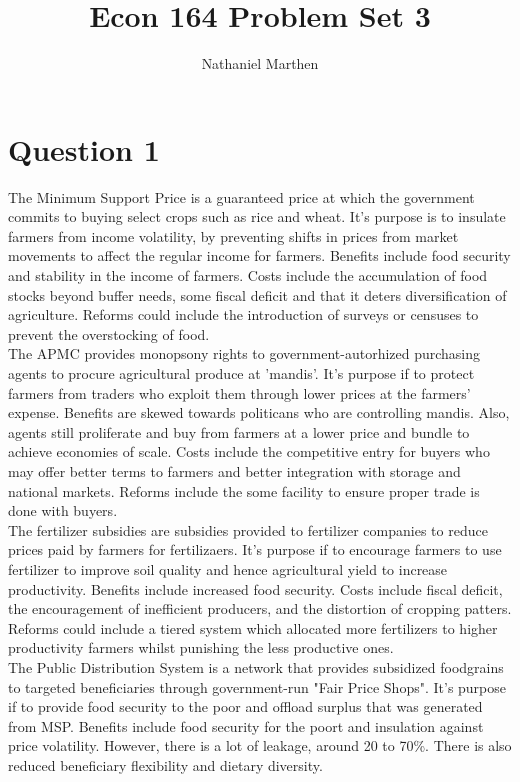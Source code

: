 \documentclass{article}
\title{Econ 164 Problem Set 3}
\author{Nathaniel Marthen}
\theoremstyle{mytheoremstyle}
\theoremstyle{mytheoremstyle}
\theoremstyle{myproblemstyle}
\begin{document}
    \maketitle
    
    \section*{Question 1}
    The Minimum Support Price is a guaranteed price at which the government commits to buying select crops such as rice and wheat. It's purpose is to insulate farmers from income volatility, by preventing shifts in prices from market movements to affect the regular income for farmers.
    Benefits include food security and stability in the income of farmers.
    Costs include the accumulation of food stocks beyond buffer needs, some fiscal deficit and that it deters diversification of agriculture.
    Reforms could include the introduction of surveys or censuses to prevent the overstocking of food.\\


    The APMC provides monopsony rights to government-autorhized purchasing agents to procure agricultural produce at 'mandis'.
    It's purpose if to protect farmers from traders who exploit them through lower prices at the farmers' expense. 
    Benefits are skewed towards politicans who are controlling mandis. Also, agents still proliferate and buy from farmers at a lower price and bundle to achieve economies of scale. 
    Costs include the competitive entry for buyers who may offer better terms to farmers and better integration with storage and national markets.
    Reforms include the some facility to ensure proper trade is done with buyers.\\ 


    The fertilizer subsidies are subsidies provided to fertilizer companies to reduce prices paid by farmers for fertilizaers. It's purpose if to encourage farmers to use fertilizer to improve soil quality and hence agricultural yield to increase productivity.
    Benefits include increased food security.
    Costs include fiscal deficit, the encouragement of inefficient producers, and the distortion of cropping patters. 
    Reforms could include a tiered system which allocated more fertilizers to higher productivity farmers whilst punishing the less productive ones.\\
    
    The Public Distribution System is a network that provides subsidized foodgrains to targeted beneficiaries through government-run "Fair Price Shops". 
    It's purpose if to provide food security to the poor and offload surplus that was generated from MSP. 
    Benefits include food security for the poort and insulation against price volatility. 
    However, there is a lot of leakage, around 20 to 70\%. There is also reduced beneficiary flexibility and dietary diversity.\\ 
\end{document}
